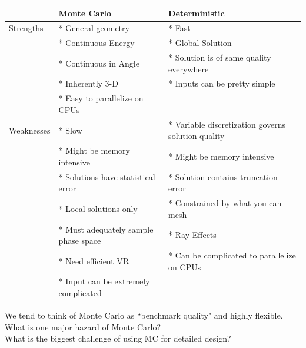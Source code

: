 \documentclass[12pt]{article}
\begin{document}
\begin{center}
\begin{tabu}{| l | X | X |}
  \hline
  & Monte Carlo         & Deterministic \\\hline
    Strengths & * General geometry    & * Fast \\
              & * Continuous Energy   & * Global Solution\\
              & * Continuous in Angle & * Solution is of same quality everywhere\\
              & * Inherently 3-D      & * Inputs can be pretty simple \\
              & * Easy to parallelize on CPUs & \\\hline
    Weaknesses & * Slow & * Variable discretization governs solution quality \\
               & * Might be memory intensive & * Might be memory intensive \\
               & * Solutions have statistical error & * Solution contains truncation error\\
               & * Local solutions only & * Constrained by what you can mesh \\
               & * Must adequately sample phase space & * Ray Effects \\
               & * Need efficient VR & * Can be complicated to parallelize on CPUs \\
               & * Input can be extremely complicated & \\\hline
\end{tabu}
\end{center}
We tend to think of Monte Carlo as ``benchmark quality" and highly flexible. \\
What is one major hazard of Monte Carlo?\\
What is the biggest challenge of using MC for detailed design?
\end{document}
